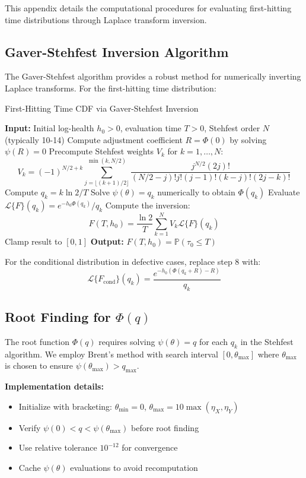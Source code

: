 \documentclass{article}
\theoremstyle{definition}
\begin{document}
This appendix details the computational procedures for evaluating first-hitting time distributions through Laplace transform inversion.

\subsection{Gaver-Stehfest Inversion Algorithm}

The Gaver-Stehfest algorithm provides a robust method for numerically inverting Laplace transforms. For the first-hitting time distribution:

\begin{algorithm}
\caption{First-Hitting Time CDF via Gaver-Stehfest Inversion}
\label{alg:gaver_stehfest_appendix}
\begin{algorithmic}[1]
\STATE \textbf{Input:} Initial log-health $h_0 > 0$, evaluation time $T > 0$, Stehfest order $N$ (typically 10-14)
\STATE Compute adjustment coefficient $R = \Phi(0)$ by solving $\psi(R) = 0$
\STATE Precompute Stehfest weights $V_k$ for $k = 1, \ldots, N$:
\[
V_k = (-1)^{N/2+k} \sum_{j=\lfloor(k+1)/2\rfloor}^{\min(k,N/2)} \frac{j^{N/2} (2j)!}{(N/2-j)! j! (j-1)! (k-j)! (2j-k)!}
\]
    \STATE Compute $q_k = k \ln 2 / T$
    \STATE Solve $\psi(\theta) = q_k$ numerically to obtain $\Phi(q_k)$
    \STATE Evaluate $\mathcal{L}\{F\}(q_k) = e^{-h_0 \Phi(q_k)} / q_k$
\ENDFOR
\STATE Compute the inversion:
\[
F(T,h_0) = \frac{\ln 2}{T} \sum_{k=1}^{N} V_k \mathcal{L}\{F\}(q_k)
\]
\STATE Clamp result to $[0,1]$
\STATE \textbf{Output:} $F(T,h_0) = \mathbb{P}(\tau_0 \leq T)$
\end{algorithmic}
\end{algorithm}

For the conditional distribution in defective cases, replace step 8 with:
\[
\mathcal{L}\{F_{\mathrm{cond}}\}(q_k) = \frac{e^{-h_0 (\Phi(q_k+R) - R)}}{q_k}
\]

\subsection{Root Finding for $\Phi(q)$}

The root function $\Phi(q)$ requires solving $\psi(\theta) = q$ for each $q_k$ in the Stehfest algorithm. We employ Brent's method with search interval $[0, \theta_{\max}]$ where $\theta_{\max}$ is chosen to ensure $\psi(\theta_{\max}) > q_{\max}$.

\textbf{Implementation details:}
\begin{itemize}
    \item Initialize with bracketing: $\theta_{\min} = 0$, $\theta_{\max} = 10 \max(\eta_X, \eta_Y)$
    \item Verify $\psi(0) < q < \psi(\theta_{\max})$ before root finding
    \item Use relative tolerance $10^{-12}$ for convergence
    \item Cache $\psi(\theta)$ evaluations to avoid recomputation
\end{itemize}
\end{document}
